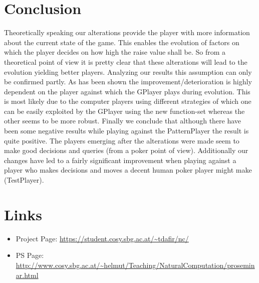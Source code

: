 \documentclass[12pt,fleqn,a4paper]{article}
\begin{document}
\newpage
\section{Conclusion}
Theoretically speaking our alterations provide the player with more information about the current state of the game. This enables the evolution of factors on which the player decides on how high the raise value
shall be. So from a theoretical point of view it is pretty clear that these alterations will lead to the evolution yielding better players. Analyzing our results this assumption can only be confirmed partly. As has been shown the improvement/deterioration is highly dependent on the player against which the GPlayer plays during evolution. This is most likely due to the computer players using different strategies of which one can be easily exploited by the GPlayer using the new function-set whereas the other seems to be more robust. Finally we conclude that although there have been some negative results while playing against the PatternPlayer the result is quite positive. The players emerging after the alterations were made seem to make good decisions and queries (from a poker point of view). Additionally our changes have led to a fairly significant improvement when playing against a player who makes decisions and moves a decent human poker player might make (TestPlayer). 

\newpage


\section{Links}

\begin{itemize}
\item Project Page: \url{https://student.cosy.sbg.ac.at/~tdafir/nc/}
\item PS Page:
\url{http://www.cosy.sbg.ac.at/~helmut/Teaching/NaturalComputation/proseminar.html}

\end{itemize}

\nocite{*}

\end{document}
